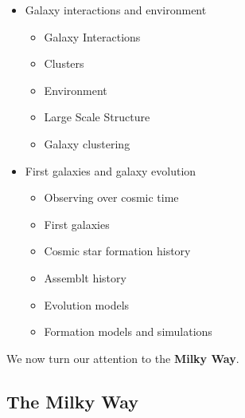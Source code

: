 \documentclass{article}
\begin{document}
\begin{itemize}
\begin{itemize}
    \end{itemize}
    \item Galaxy interactions and environment
    \begin{itemize}
        \item Galaxy Interactions
        \item Clusters
        \item Environment
        \item Large Scale Structure
        \item Galaxy clustering
    \end{itemize}
    \item First galaxies and galaxy evolution
    \begin{itemize}
        \item Observing over cosmic time
        \item First galaxies
        \item Cosmic star formation history
        \item Assemblt history
        \item Evolution models
        \item Formation models and simulations
    \end{itemize}
\end{itemize}

We now turn our attention to the\textbf{ Milky Way}.

\subsection{The Milky Way}
\end{document}
